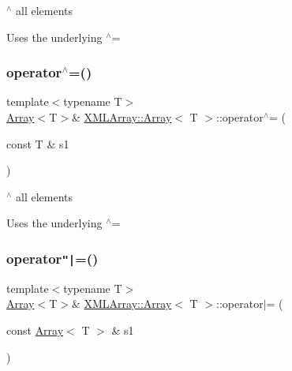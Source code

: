 $^\wedge$ all elements 

Uses the underlying $^\wedge$= \mbox{\label{classXMLArray_1_1Array_ac68e4b59911e762c271c90a6aa81e0c3}} 
\subsubsection{\texorpdfstring{operator$^\wedge$=()}{operator^=()}\hspace{0.1cm}{\footnotesize\ttfamily [6/6]}}
{\footnotesize\ttfamily template$<$typename T$>$ \\
\mbox{\hyperlink{classXMLArray_1_1Array}{Array}}$<$T$>$\& \mbox{\hyperlink{classXMLArray_1_1Array}{X\+M\+L\+Array\+::\+Array}}$<$ T $>$\+::operator$^\wedge$= (\begin{DoxyParamCaption}\item[{const T \&}]{s1 }\end{DoxyParamCaption})\hspace{0.3cm}{\ttfamily [inline]}}



$^\wedge$ all elements 

Uses the underlying $^\wedge$= \mbox{\label{classXMLArray_1_1Array_a4a61c5f3146f39c99758bad927e08de7}} 
\subsubsection{\texorpdfstring{operator\texttt{"|}=()}{operator|=()}\hspace{0.1cm}{\footnotesize\ttfamily [1/6]}}
{\footnotesize\ttfamily template$<$typename T$>$ \\
\mbox{\hyperlink{classXMLArray_1_1Array}{Array}}$<$T$>$\& \mbox{\hyperlink{classXMLArray_1_1Array}{X\+M\+L\+Array\+::\+Array}}$<$ T $>$\+::operator$\vert$= (\begin{DoxyParamCaption}\item[{const \mbox{\hyperlink{classXMLArray_1_1Array}{Array}}$<$ T $>$ \&}]{s1 }\end{DoxyParamCaption})\hspace{0.3cm}{\ttfamily [inline]}}



